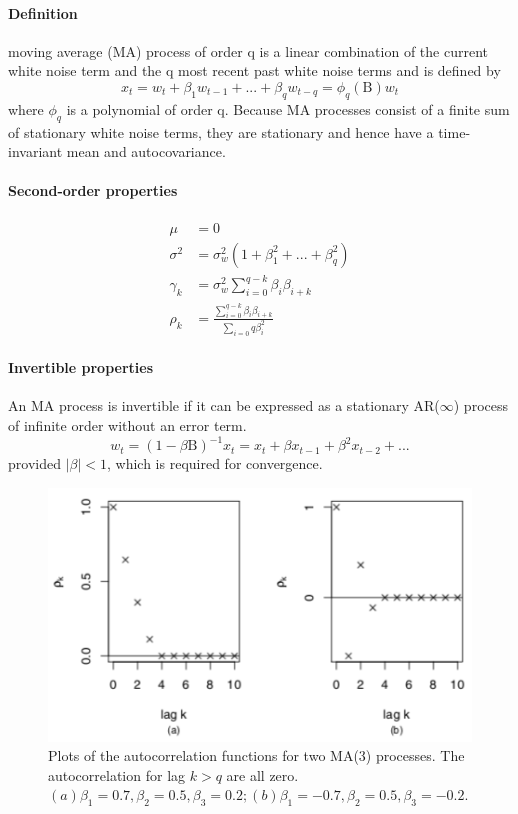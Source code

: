 \paragraph{Definition}
 moving average (MA) process of order q is a linear combination of the current white noise term and the q most recent past white noise terms and is defined by
\[ x_t = w_t + \beta_1 w_{t-1} + ... + \beta_q w_{t-q} = \phi_q(\mathrm{B}) w_t \]
where $\phi_q$ is a polynomial of order q. Because MA processes consist of a finite sum of stationary white noise terms, they are stationary and hence have a time-invariant mean and autocovariance.

\paragraph{Second-order properties}
\begin{align*}
    \mu &= 0 \\
    \sigma^2 &= \sigma_w^2 (1 + \beta_1^2 + ... + \beta_q^2) \\
    \gamma_k &= \sigma_w^2 \sum_{i=0}^{q-k} \beta_i \beta_{i+k} \\
    \rho_k &= \frac{\sum_{i=0}^{q-k} \beta_i \beta_{i+k}}{\sum_{i=0}{q} \beta_i^2 }
\end{align*}

\paragraph{Invertible properties}
An MA process is invertible if it can be expressed as a stationary AR($\infty$) process of infinite order without an error term.
\[ w_t = (1 - \beta \mathrm{B})^{-1} x_t = x_t + \beta x_{t-1} + \beta^2 x_{t-2} + ... \]
provided $|\beta| < 1$, which is required for convergence.

\begin{figure}[!ht]
    \centering
    \includegraphics[scale=0.7]{src/SerieChronologique/MA-Correlogram.png}
    \caption{Plots of the autocorrelation functions for two MA(3) processes. The autocorrelation for lag $k>q$ are all zero. $(a) \beta_1 = 0.7, \beta_2 = 0.5, \beta_3 = 0.2; (b) \beta_1 = -0.7, \beta_2 = 0.5, \beta_3 = -0.2$.}
\end{figure}

